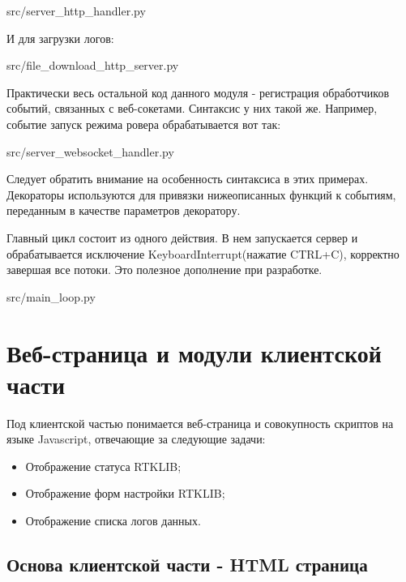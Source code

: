 
{src/server_http_handler.py}

И для загрузки логов:


{src/file_download_http_server.py}

Практически весь остальной код данного модуля - регистрация обработчиков событий, связанных с веб-сокетами. Синтаксис у них такой же. Например, событие запуск режима ровера обрабатывается вот так:


{src/server_websocket_handler.py}

Следует обратить внимание на особенность синтаксиса в этих примерах. Декораторы используются для привязки нижеописанных функций к событиям, переданным в качестве параметров декоратору.

Главный цикл состоит из одного действия. В нем запускается сервер и обрабатывается исключение KeyboardInterrupt(нажатие CTRL+C), корректно завершая все потоки. Это полезное дополнение при разработке.


{src/main_loop.py}

\section{Веб-страница и модули клиентской части} \label{sect3_2}

Под клиентской частью понимается веб-страница и совокупность скриптов на языке Javascript, отвечающие за следующие задачи:

\begin{itemize}
  \item Отображение статуса RTKLIB;
  \item Отображение форм настройки RTKLIB;
  \item Отображение списка логов данных.
\end{itemize}

\subsection{Основа клиентской части - HTML страница} \label{subsect3_2_1}


